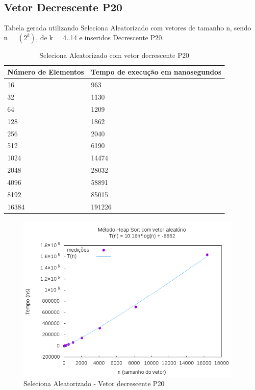 \documentclass[12pt,a4paper,twoside]{report}
\begin{document}
\subsection{Vetor Decrescente P20}
Tabela gerada utilizando Seleciona Aleatorizado com vetores de tamanho n, sendo n = $(2^k)$, de k = 4..14 e inseridos Decrescente P20.
\begin{table}[H]
\centering
\caption{Seleciona Aleatorizado com vetor decrescente P20}
\label{my-label}
\begin{tabular}{|l|l|}
\hline
\multicolumn{1}{|c|}{\textbf{Número de Elementos}} & \multicolumn{1}{c|}{\textbf{Tempo de execução em nanosegundos}} \\ \hline
16 & 963 \\ \hline
32 & 1130 \\ \hline
64 & 1209 \\ \hline
128 & 1862 \\ \hline
256 & 2040 \\ \hline
512 & 6190 \\ \hline
1024 & 14474 \\ \hline
2048 & 28032 \\ \hline
4096 & 58891 \\ \hline
8192 & 85015 \\ \hline
16384 & 191226 \\ \hline
\end{tabular}
\end{table}

\begin{figure}[H]
    \centering
    \includegraphics[width=0.7\linewidth]{graficos/HeapSort/vIntAleatorio/vIntAleatorio.png}
  \caption{Seleciona Aleatorizado - Vetor decrescente P20}
\end{figure}
\end{document}
